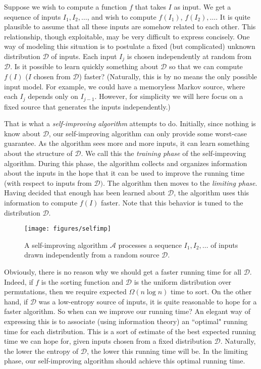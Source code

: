 \documentclass{siamltex}
\newcommand{\cA}{\mathcal{A}}
\newcommand{\D}{\mathcal{D}}
\begin{document}
Suppose we wish to compute a function $f$ that takes
$I$ as input. We get a sequence of inputs $I_1,I_2,\ldots$, and
wish to compute $f(I_1)$, $f(I_2),\ldots$.
It is quite plausible to assume that all these inputs
are somehow related to each other.
This relationship, though exploitable, may be very difficult
to express concisely.
One way of modeling this situation is to postulate
a fixed (but complicated) unknown distribution $\D$ of inputs.
Each input $I_j$ is chosen independently at random from $\D$.
Is it possible to learn quickly something about $\D$
so that we can compute $f(I)$ ($I$ chosen from $\D$) faster?
(Naturally, this is by no means the only possible input model. 
For	 example, we could have
a memoryless Markov source, where each $I_j$ depends only
on $I_{j-1}$. However, for simplicity we will
here focus on a fixed source that generates the
inputs independently.)

That is what a \emph{self-improving algorithm} attempts to do.
Initially, since nothing is know about $\D$, our 
self-improving algorithm can only provide some worst-case guarantee. 
As the algorithm sees more and more inputs, it can learn something about
the structure of $\D$. We call this
the \emph{training phase} of the self-improving algorithm.
During this phase, the algorithm collects and organizes information
about the inputs in the hope that it can be used
to improve the running time (with respect to inputs
from $\D)$. The algorithm then moves to the \emph{limiting phase}.
Having decided that enough has been learned about $\D$,
the algorithm uses this information to compute $f(I)$
faster. Note that this behavior is tuned to the distribution $\D$.
\begin{figure}
\begin{center}
\texttt{[image: figures/selfimp]}
\end{center}
\caption{A self-improving algorithm $\cA$ processes a sequence 
$I_1, I_2, \ldots$ of inputs drawn independently from a random source
$\D$.}
\end{figure}

Obviously, there is no reason why we should get a faster running time
for all $\D$. Indeed, if $f$ is the sorting function and $\D$ is the 
uniform distribution over permutations, then we require expected 
$\Omega(n \log n)$ time to sort. 
On the other hand, if $\D$ was a low-entropy source of inputs, 
it is quite reasonable to hope for a faster algorithm. 
So when can we improve our running time? An elegant way of expressing
this is to associate (using information theory) an ``optimal"
running time for each distribution. This is a sort of estimate
of the best expected running time we can hope for, given
inputs chosen from a fixed distribution $\D$. Naturally, the lower
the entropy of $\D$, the lower this running time will be.
In the limiting phase, our self-improving algorithm should achieve
this optimal running time.
\end{document}
